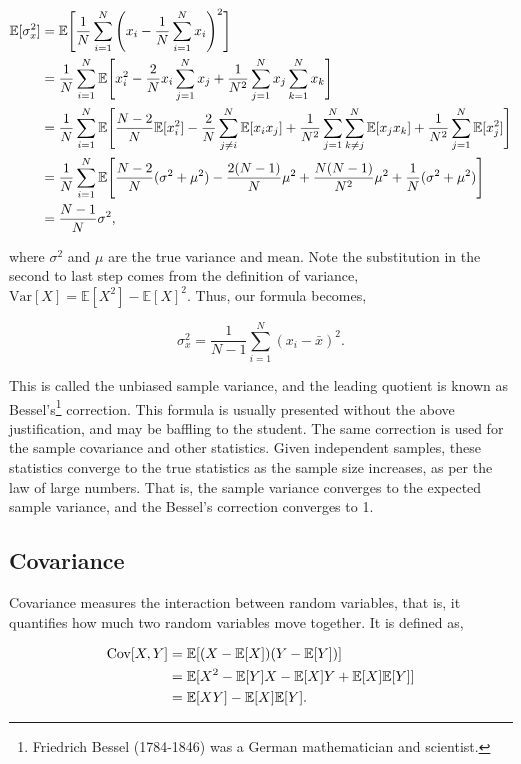\documentclass[11pt]{amsart}
\begin{document}
\begin{align}
\mathbb{E}[\sigma_x^2] &= \mathbb{E}\Bigg[\frac{1}{N}\sum_{i=1}^N\Bigg(x_i - \frac{1}{N}\sum_{i=1}^N x_i\Bigg)^2 \Bigg] \notag \\
&=\frac{1}{N}\sum_{i=1}^N\mathbb{E}\Bigg[x_i^2 - \frac{2}{N}x_i\sum_{j=1}^N x_j + \frac{1}{N^2}\sum_{j=1}^N x_j \sum_{k=1}^N x_k\Bigg] \notag \\
&=\frac{1}{N}\sum_{i=1}^N\mathbb{E}\Bigg[\frac{N-2}{N}\mathbb{E}[x_i^2] - \frac{2}{N}\sum_{j\neq i}^N \mathbb{E}[x_ix_j] + \frac{1}{N^2}\sum_{j=1}^N \sum_{k\neq j}^N \mathbb{E}[x_jx_k] + \frac{1}{N^2}\sum_{j=1}^N \mathbb{E}[x_j^2]\Bigg] \notag \\
&=\frac{1}{N}\sum_{i=1}^N\mathbb{E}\Bigg[\frac{N-2}{N}(\sigma^2 + \mu^2) - \frac{2(N - 1)}{N} \mu^2 + \frac{N(N-1)}{N^2} \mu^2 + \frac{1}{N} (\sigma^2 + \mu^2)\Bigg] \notag \\
&= \frac{N-1}{N}\sigma^2, \notag
\end{align}

where $\sigma^2$ and $\mu$ are the true variance and mean. Note the substitution in the second to last step comes from the definition of variance, $\text{Var}[X] = \mathbb{E}[X^2] - \mathbb{E}[X]^2$. Thus, our formula becomes,

$$\sigma_x^2 = \frac{1}{N-1}\sum_{i=1}^N (x_i - \bar{x})^2.$$

This is called the unbiased sample variance, and the leading quotient is known as Bessel's\footnote{Friedrich Bessel (1784-1846) was a German mathematician and scientist.} correction. This formula is usually presented without the above justification, and may be baffling to the student. The same correction is used for the sample covariance and other statistics. Given independent samples, these statistics converge to the true statistics as the sample size increases, as per the law of large numbers. That is, the sample variance converges to the expected sample variance, and the Bessel's correction converges to 1.

\subsection{Covariance}

Covariance measures the interaction between random variables, that is, it quantifies how much two random variables move together. It is defined as,

\begin{align}
\text{Cov}[X, Y] &= \mathbb{E}[(X - \mathbb{E}[X])(Y - \mathbb{E}[Y])] \notag \\
&= \mathbb{E}[X^2 - \mathbb{E}[Y]X - \mathbb{E}[X]Y + \mathbb{E}[X]\mathbb{E}[Y]] \notag \\
&= \mathbb{E}[XY] - \mathbb{E}[X]\mathbb{E}[Y]. \notag
\end{align}
\end{document}
